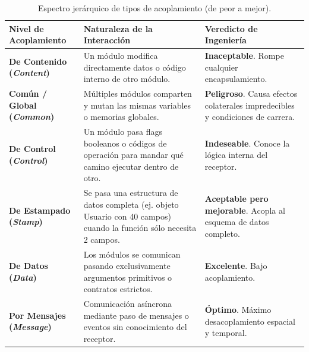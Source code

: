 \begin{table}[htbp]
\centering
\small
\begin{tabularx}{\textwidth}{l p{5cm} X}
\toprule
\textbf{Nivel de Acoplamiento} & \textbf{Naturaleza de la Interacción} & \textbf{Veredicto de Ingeniería} \\
\midrule
\textbf{De Contenido (\emph{Content})} & Un módulo modifica directamente datos o código interno de otro módulo. & \textcolor{alertred}{\textbf{Inaceptable}}. Rompe cualquier encapsulamiento. \\
\addlinespace
\textbf{Común / Global (\emph{Common})} & Múltiples módulos comparten y mutan las mismas variables o memorias globales. & \textcolor{alertred}{\textbf{Peligroso}}. Causa efectos colaterales impredecibles y condiciones de carrera. \\
\addlinespace
\textbf{De Control (\emph{Control})} & Un módulo pasa flags booleanos o códigos de operación para mandar qué camino ejecutar dentro de otro. & \textcolor{accent}{\textbf{Indeseable}}. Conoce la lógica interna del receptor. \\
\addlinespace
\textbf{De Estampado (\emph{Stamp})} & Se pasa una estructura de datos completa (ej. objeto Usuario con 40 campos) cuando la función sólo necesita 2 campos. & \textcolor{accent}{\textbf{Aceptable pero mejorable}}. Acopla al esquema de datos completo. \\
\addlinespace
\textbf{De Datos (\emph{Data})} & Los módulos se comunican pasando exclusivamente argumentos primitivos o contratos estrictos. & \textcolor{alertgreen}{\textbf{Excelente}}. Bajo acoplamiento. \\
\addlinespace
\textbf{Por Mensajes (\emph{Message})} & Comunicación asíncrona mediante paso de mensajes o eventos sin conocimiento del receptor. & \textcolor{alertgreen}{\textbf{Óptimo}}. Máximo desacoplamiento espacial y temporal. \\
\bottomrule
\end{tabularx}
\caption{Espectro jerárquico de tipos de acoplamiento (de peor a mejor).}
\label{tab:tipos-acoplamiento}
\end{table}

